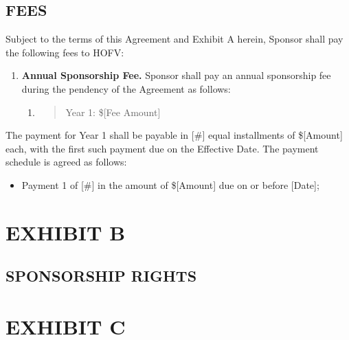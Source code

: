 \documentclass{article}
\begin{document}
\hypertarget{fees}{%
\subsection{FEES}\label{fees}}

Subject to the terms of this Agreement and Exhibit A herein, Sponsor
shall pay the following fees to HOFV:

\begin{enumerate}
\def\labelenumi{\arabic{enumi}.}
\item
  \textbf{Annual Sponsorship Fee.} Sponsor shall pay an annual
  sponsorship fee during the pendency of the Agreement as follows:

  \begin{enumerate}
  \def\labelenumii{\alph{enumii}.}
  \item
    \begin{quote}
    Year 1: \${[}Fee Amount{]}
    \end{quote}
  \end{enumerate}
\end{enumerate}

The payment for Year 1 shall be payable in {[}\#{]} equal installments
of \${[}Amount{]} each, with the first such payment due on the Effective
Date. The payment schedule is agreed as follows:

\begin{itemize}
\item
  Payment 1 of {[}\#{]} in the amount of \${[}Amount{]} due on or before
  {[}Date{]};
\end{itemize}

\hypertarget{section}{%
\subsection{}\label{section}}

\hypertarget{exhibit-b}{%
\section{EXHIBIT B}\label{exhibit-b}}

\hypertarget{sponsorship-rights}{%
\subsection{SPONSORSHIP RIGHTS}\label{sponsorship-rights}}

\hypertarget{exhibit-c}{%
\section{EXHIBIT C}\label{exhibit-c}}
\end{document}
